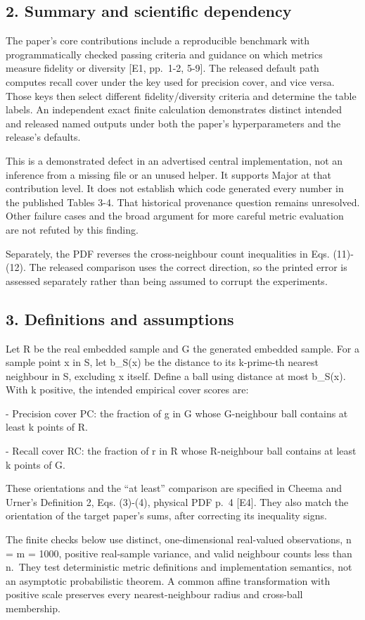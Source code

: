 \documentclass[10pt]{article}
\begin{document}
\subsection*{2. Summary and scientific dependency}
The paper’s core contributions include a reproducible benchmark with programmatically checked passing criteria and guidance on which metrics measure fidelity or diversity [E1, pp. 1-2, 5-9]. The released default path computes recall cover under the key used for precision cover, and vice versa. Those keys then select different fidelity/diversity criteria and determine the table labels. An independent exact finite calculation demonstrates distinct intended and released named outputs under both the paper’s hyperparameters and the release’s defaults.\par
This is a demonstrated defect in an advertised central implementation, not an inference from a missing file or an unused helper. It supports Major at that contribution level. It does not establish which code generated every number in the published Tables 3-4. That historical provenance question remains unresolved. Other failure cases and the broad argument for more careful metric evaluation are not refuted by this finding.\par
Separately, the PDF reverses the cross-neighbour count inequalities in Eqs. (11)-(12). The released comparison uses the correct direction, so the printed error is assessed separately rather than being assumed to corrupt the experiments.\par
\subsection*{3. Definitions and assumptions}
Let R be the real embedded sample and G the generated embedded sample. For a sample point x in S, let b\_S(x) be the distance to its k-prime-th nearest neighbour in S, excluding x itself. Define a ball using distance at most b\_S(x). With k positive, the intended empirical cover scores are:\par
- Precision cover PC: the fraction of g in G whose G-neighbour ball contains at least k points of R.\par
- Recall cover RC: the fraction of r in R whose R-neighbour ball contains at least k points of G.\par
These orientations and the “at least” comparison are specified in Cheema and Urner’s Definition 2, Eqs. (3)-(4), physical PDF p. 4 [E4]. They also match the orientation of the target paper’s sums, after correcting its inequality signs.\par
The finite checks below use distinct, one-dimensional real-valued observations, n = m = 1000, positive real-sample variance, and valid neighbour counts less than n. They test deterministic metric definitions and implementation semantics, not an asymptotic probabilistic theorem. A common affine transformation with positive scale preserves every nearest-neighbour radius and cross-ball membership.\par
\end{document}
